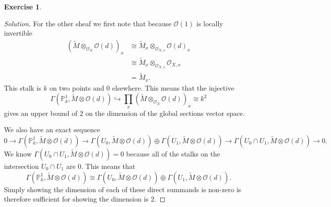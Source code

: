 \documentclass{article}
\renewcommand{\qedsymbol}{\raisebox{-0.5cm}{}}
\newcommand{\proj}{\mathbb{P}}
\newcommand{\sheaf}{\mathcal{O}}
\newenvironment{solution}{\begin{proof}[Solution]\renewcommand\qedsymbol{}}{\end{proof}}
\theoremstyle{definition}
\newtheorem{question}{Exercise}
\begin{document}
\begin{question}
\begin{enumerate}[(a)]
\begin{solution}
                  For the other sheaf we first note that because \(\sheaf(1)\)
                  is locally invertible
                  \begin{align*}
                      (\tilde{M}\otimes_{\sheaf_{X}}\sheaf(d))_{x} & \cong\tilde{M}_{x}\otimes_{\sheaf_{X,x}}\sheaf(d)_{x} \\
                                                                   & \cong\tilde{M}_{x}\otimes_{\sheaf_{X,x}}\sheaf_{X,x}  \\
                                                                   & =\tilde{M}_{x}.
                  \end{align*}
                  This stalk is \(k\) on two points and \(0\) elsewhere.
                  This means that the injective
                  \[
                      \Gamma(\proj^{1}_{k},\tilde{M}\otimes\sheaf(d))\hookrightarrow\prod_{x}(\tilde{M}\otimes_{\sheaf_{X}}\sheaf(d))_{x}\cong k^{2}
                  \]
                  gives an upper bound of \(2\) on the dimension of the global
                  sections vector space.

                  We also have an exact sequence
                  \[
                      0\to\Gamma(\proj^{1}_{k},\tilde{M}\otimes\sheaf(d))\to\Gamma(U_{0},\tilde{M}\otimes\sheaf(d))\oplus\Gamma(U_{1},\tilde{M}\otimes\sheaf(d))\to\Gamma(U_{0}\cap U_{1},\tilde{M}\otimes\sheaf(d))\to 0.
                  \]
                  We know \(\Gamma(U_{0}\cap
                  U_{1},\tilde{M}\otimes\sheaf(d))=0\) because all of the stalks
                  on the intersection \(U_{0}\cap U_{1}\) are \(0\). This means
                  that
                  \[
                      \Gamma(\proj^{1}_{k},\tilde{M}\otimes\sheaf(d))\cong\Gamma(U_{0},\tilde{M}\otimes\sheaf(d))\oplus\Gamma(U_{1},\tilde{M}\otimes\sheaf(d)).
                  \]
                  Simply showing the dimension of each of these direct summands
                  is non-zero is therefore sufficient for showing the dimension
                  is \(2\).


\end{solution}
\end{enumerate}
\end{question}
\end{document}
